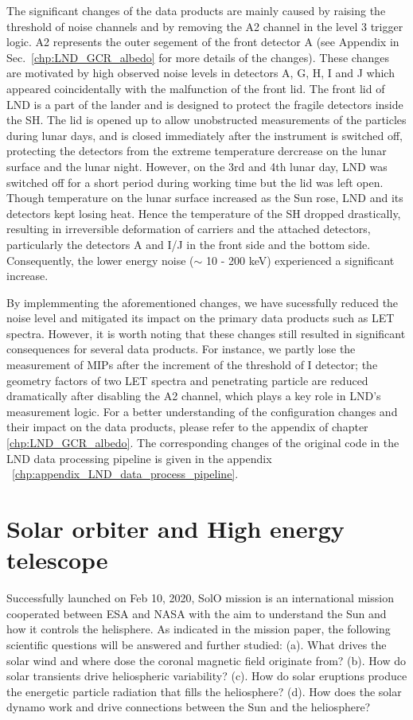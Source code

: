 The significant changes of the data products are mainly caused by raising the threshold of noise channels and by removing the A2 channel in the level 3 trigger logic. A2 represents the outer segement of the front detector A (see Appendix in Sec.~\ref{chp:LND_GCR_albedo} for more details of the changes). These changes are motivated by high observed noise levels in detectors A, G, H, I and J which appeared coincidentally with the malfunction of the front lid. The front lid of \ac{LND} is a part of the lander and is designed to protect the fragile detectors inside the \ac{SH}. The lid is opened up to allow unobstructed measurements of the particles during lunar days, and is closed immediately after the instrument is switched off, protecting the detectors from the extreme temperature dercrease on the lunar surface and the lunar night. However, on the 3rd and 4th lunar day, \ac{LND} was switched off for a short period during working time but the lid was left open. Though temperature on the lunar surface increased as the Sun rose, \ac{LND} and its detectors kept losing heat. Hence the temperature of the \ac{SH} dropped drastically, resulting in irreversible deformation of carriers and the attached detectors, particularly the detectors A and I/J in the front side and the bottom side. Consequently, the lower energy noise ($\sim$ 10 - 200 keV) experienced a significant increase.

By implemmenting the aforementioned changes, we have sucessfully reduced the noise level and mitigated its impact on the primary data products such as \ac{LET} spectra. However, it is worth noting that these changes still resulted in significant consequences for several data products. For instance, we partly lose the measurement of \acp{MIP} after the increment of the threshold of I detector; the geometry factors of two \ac{LET} spectra and penetrating particle are reduced dramatically after disabling the A2 channel, which plays a key role in \ac{LND}'s measurement logic. For a better understanding of the configuration changes and their impact on the data products, please refer to the appendix of chapter \ref{chp:LND_GCR_albedo}.
The corresponding changes of the original code in the LND data processing pipeline is given in the appendix ~\ref{chp:appendix_LND_data_process_pipeline}.

\section{Solar orbiter and High energy telescope}
\label{sec:Solar_Orbiter}
Successfully launched on Feb 10, 2020, \ac{SolO} mission \citep{Mueller-2020-SolO} is an international mission cooperated between \ac{ESA} and \ac{NASA} with the aim to understand the Sun and how it controls the helisphere. As indicated in the mission paper, the following scientific questions will be answered and further studied: (a). What drives the solar wind and where dose the coronal magnetic field originate from? (b). How do solar transients drive heliospheric variability? (c). How do solar eruptions produce the energetic particle radiation that fills the heliosphere? (d). How does the solar dynamo work and drive connections between the Sun and the heliosphere?

